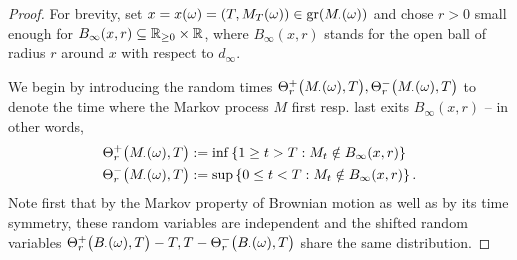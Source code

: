 \begin{proof}
  For brevity, set $x=x(\omega)=(T,M_T(\omega))\in\operatorname{gr}(M_\cdot(\omega))$ and chose $r>0$ small enough for $B_\infty(x,r)\subseteq\mathbb{R}_{\geq0}\times\mathbb{R}$, where 
  $B_\infty(x,r)$ stands for the open ball of radius $r$ around $x$ with respect to $d_\infty$.
  
  We begin by introducing the random times 
  $\Theta^+_r\big(M_\cdot(\omega),T\big),\Theta^-_r\big(M_\cdot(\omega),T\big)$ to denote the time where the Markov process $M$ first resp. last exits 
  $B_\infty(x,r)$ -- in other words,
  \begin{align}\label{eq:Theta}
    \Theta^+_r\big(M_\cdot(\omega),T\big)&:=\inf\left\{1\geq t>T:M_t\notin B_\infty(x,r)\right\}\notag\\
    \Theta^-_r\big(M_\cdot(\omega),T\big)&:=\sup\left\{0\leq t<T:M_t\notin B_\infty(x,r)\right\}.
  \end{align}
  Note first that by the Markov property of Brownian motion as well as by its time symmetry, these random variables are independent and the shifted random variables $\Theta^+_r\big(B_\cdot(\omega),T\big)-T,T-\Theta^-_r\big(B_\cdot(\omega),T\big)$ share the same distribution.
  

\end{proof}
